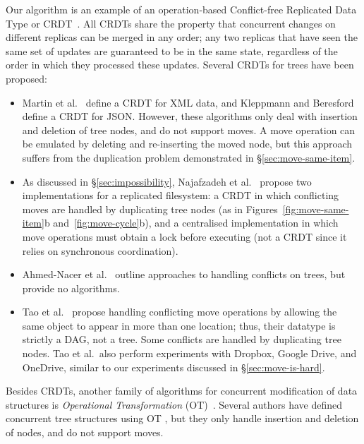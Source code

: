 \documentclass[10pt,journal,compsoc]{IEEEtran}
\begin{document}
Our algorithm is an example of an operation-based Conflict-free Replicated Data Type or CRDT~\cite{Shapiro:2011un,Burckhardt:2014ft}.
All CRDTs share the property that concurrent changes on different replicas can be merged in any order; any two replicas that have seen the same set of updates are guaranteed to be in the same state, regardless of the order in which they processed these updates.
Several CRDTs for trees have been proposed:
\begin{itemize}
    \item Martin et al.~\cite{Martin:2010ih} define a CRDT for XML data, and Kleppmann and Beresford~\cite{Kleppmann:2016ve} define a CRDT for JSON.
        However, these algorithms only deal with insertion and deletion of tree nodes, and do not support moves.
        A move operation can be emulated by deleting and re-inserting the moved node, but this approach suffers from the duplication problem demonstrated in \S\ref{sec:move-same-item}.
    \item As discussed in \S\ref{sec:impossibility}, Najafzadeh et al.~\cite{Najafzadeh:2017vk,Najafzadeh:2018bw} propose two implementations for a replicated filesystem: a CRDT in which conflicting moves are handled by duplicating tree nodes (as in Figures~\ref{fig:move-same-item}b and~\ref{fig:move-cycle}b), and a centralised implementation in which move operations must obtain a lock before executing (not a CRDT since it relies on synchronous coordination).
    \item Ahmed-Nacer et al.~\cite{AhmedNacer:2012us} outline approaches to handling conflicts on trees, but provide no algorithms.
    \item Tao et al.~\cite{Tao:2015gd} propose handling conflicting move operations by allowing the same object to appear in more than one location; thus, their datatype is strictly a DAG, not a tree.
        Some conflicts are handled by duplicating tree nodes.
        Tao et al.\ also perform experiments with Dropbox, Google Drive, and OneDrive, similar to our experiments discussed in \S\ref{sec:move-is-hard}.
\end{itemize}

Besides CRDTs, another family of algorithms for concurrent modification of data structures is \emph{Operational Transformation} (OT)~\cite{Sun:1998vf}.
Several authors have defined concurrent tree structures using OT \cite{Jungnickel:2016cb,Ignat:2003jy,Davis:2002iv}, but they only handle insertion and deletion of nodes, and do not support moves.
\end{document}
